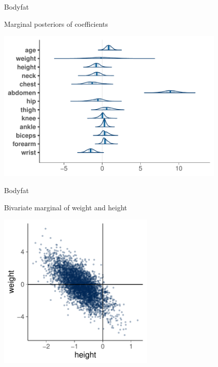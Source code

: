 \documentclass[english,t]{beamer}
\begin{document}
\begin{frame}{Bodyfat}

  \vspace{-0.55\baselineskip}
  Marginal posteriors of coefficients
  
  \includegraphics[width=11cm]{bodyfat_mcmc_areas.pdf}

\end{frame}

\begin{frame}{Bodyfat}

  \vspace{-0.55\baselineskip}
  Bivariate marginal of weight and height
  
  \includegraphics[width=7.5cm]{bodyfat_mcmc_scatter.pdf}

\end{frame}
\end{document}
